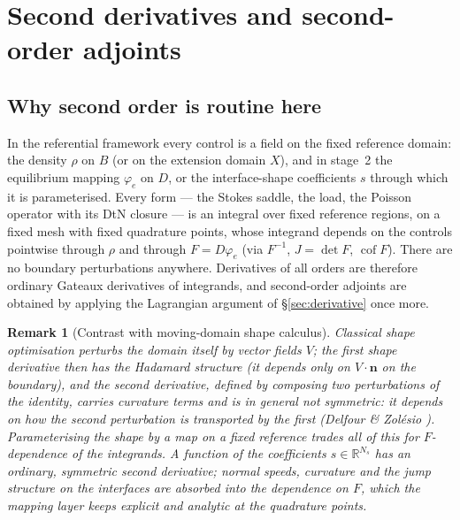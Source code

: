 \documentclass[11pt]{article}
\newtheorem{remark}{Remark}
\newcommand{\R}{\mathbb{R}}
\newcommand{\bn}{\mathbf{n}}
\newcommand{\cof}{\operatorname{cof}}
\begin{document}
\section{Second derivatives and second-order adjoints}
\label{sec:second}

\subsection{Why second order is routine here}

In the referential framework every control is a field on the fixed
reference domain: the density $\rho$ on $B$ (or on the extension domain
$X$), and in stage~2 the equilibrium mapping $\varphi_e$ on $D$, or the
interface-shape coefficients $s$ through which it is parameterised.
Every form --- the Stokes saddle, the load, the Poisson operator with
its DtN closure --- is an integral over fixed reference regions, on a
fixed mesh with fixed quadrature points, whose integrand depends on the
controls pointwise through $\rho$ and through $F = D\varphi_e$ (via
$F^{-1}$, $J = \det F$, $\cof F$). There are no boundary perturbations
anywhere. Derivatives of all orders are therefore ordinary Gateaux
derivatives of integrands, and second-order adjoints are obtained by
applying the Lagrangian argument of \S\ref{sec:derivative} once more.

\begin{remark}[Contrast with moving-domain shape calculus]
Classical shape optimisation perturbs the domain itself by vector fields
$V$; the first shape derivative then has the Hadamard structure (it
depends only on $V\cdot\bn$ on the boundary), and the second derivative,
defined by composing two perturbations of the identity, carries
curvature terms and is in general not symmetric: it depends on how the
second perturbation is transported by the first (Delfour \& Zol\'esio
\cite{DelfourZolesio}). Parameterising the shape by a map on a fixed
reference trades all of this for $F$-dependence of the integrands. A
function of the coefficients $s\in\R^{N_s}$ has an ordinary, symmetric
second derivative; normal speeds, curvature and the jump structure on the
interfaces are absorbed into the dependence on $F$, which the mapping
layer keeps explicit and analytic at the quadrature points.
\end{remark}
\end{document}
